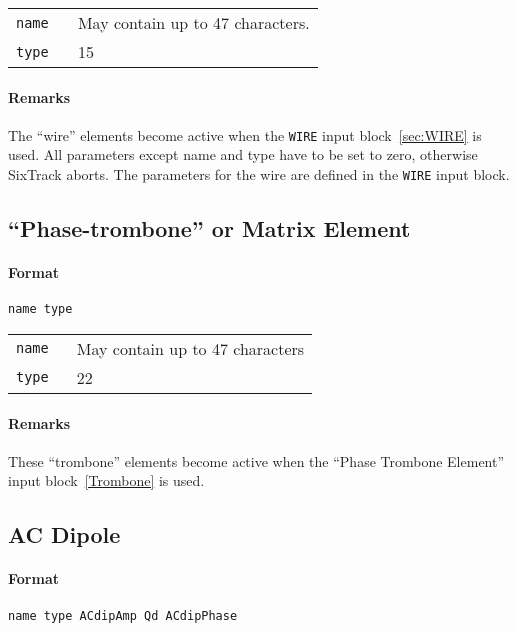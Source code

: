 \bigskip
\begin{tabular}{@{}lp{0.8\linewidth}}
    \texttt{name} & May contain up to 47 characters. \\
    \texttt{type} & 15
\end{tabular}

\paragraph{Remarks}
The ``wire'' elements become active when the \texttt{WIRE} input block~\ref{sec:WIRE} is used.
All parameters except name and type have to be set to zero, otherwise SixTrack aborts.
The parameters for the wire are defined in the \texttt{WIRE} input block.

\subsection{``Phase-trombone'' or Matrix Element} \label{PT}

\paragraph{Format} \texttt{name type}

\bigskip
\begin{tabular}{@{}lp{0.8\linewidth}}
    \texttt{name} & May contain up to 47 characters \\
    \texttt{type} & 22
\end{tabular}

\paragraph{Remarks}
These ``trombone'' elements become active when the ``Phase Trombone Element'' input block~\ref{Trombone} is used.

\subsection{AC Dipole} \label{ACDIP}

\paragraph{Format} \texttt{name type ACdipAmp Qd ACdipPhase}

